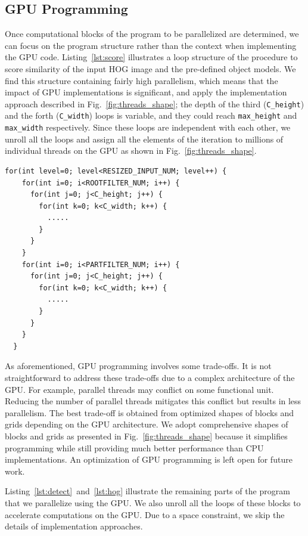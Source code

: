 \subsection{GPU Programming}

Once computational blocks of the program to be parallelized are
determined, we can focus on the program structure rather than the
context when implementing the GPU code.
Listing~\ref{lst:score} illustrates a loop structure of the procedure
to score similarity of the input HOG image and the pre-defined object
models.
We find this structure containing fairly high parallelism, which means
that the impact of GPU implementations is significant, and apply the
implementation approach described in Fig.~\ref{fig:threads_shape}; the
depth of the third (\texttt{C\_height}) and the forth
(\texttt{C\_width}) loops is variable, and they could reach
\texttt{max\_height} and \texttt{max\_width} respectively.
Since these loops are independent with each other, we unroll all the
loops and assign all the elements of the iteration to millions of
individual threads on the GPU as shown in Fig.~\ref{fig:threads_shape}.

\begin{lstlisting}[caption=The program structure of similarity scoring, label=lst:score]
  for(int level=0; level<RESIZED_INPUT_NUM; level++) {
    for(int i=0; i<ROOTFILTER_NUM; i++) {
      for(int j=0; j<C_height; j++) {
        for(int k=0; k<C_width; k++) {
          .....
        }
      }
    }
    for(int i=0; i<PARTFILTER_NUM; i++) {
      for(int j=0; j<C_height; j++) {
        for(int k=0; k<C_width; k++) {
          .....
        }
      }
    }
  }
\end{lstlisting}

As aforementioned, GPU programming involves some trade-offs.
It is not straightforward to address these trade-offs due to a complex
architecture of the GPU.
For example, parallel threads may conflict on some functional unit.
Reducing the number of parallel threads mitigates this conflict but
results in less parallelism.
The best trade-off is obtained from optimized shapes of blocks and grids
depending on the GPU architecture.
We adopt comprehensive shapes of blocks and grids as presented in
Fig.~\ref{fig:threads_shape} because it simplifies programming while
still providing much better performance than CPU implementations.
An optimization of GPU programming is left open for future work.

Listing~\ref{lst:detect}~and~\ref{lst:hog} illustrate the remaining parts
of the program that we parallelize using the GPU.
We also unroll all the loops of these blocks to accelerate computations
on the GPU.
Due to a space constraint, we skip the details of implementation approaches.


